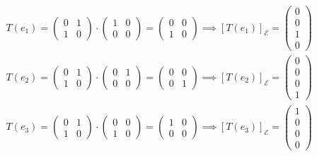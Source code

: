 \documentclass[12pt, titlepage]{article}
\begin{document}
\begin{gather*}
    T\left(e_1\right) = \begin{pmatrix}
        0 &1 \\ 1 & 0
    \end{pmatrix} \cdot \begin{pmatrix}
        1 & 0 \\ 0 & 0 
    \end{pmatrix} = \begin{pmatrix}
        0 & 0 \\ 1 & 0
    \end{pmatrix} \implies \left[T\left(e_1\right)\right]_\mathcal{E} = \begin{pmatrix}
        0\\0\\1\\0  \end{pmatrix} \\
     T\left(
e_2\right)  = \begin{pmatrix}0&1\\1&0\end{pmatrix}             \cdot \begin{pmatrix}
                0 & 1 \\ 0 & 0 
            \end{pmatrix}
 =\begin{pmatrix}
     0 & 0 \\ 0 & 1
 \end{pmatrix} \implies \left[T\left(e_2\right)\right]_\mathcal{E} = \begin{pmatrix}
        0\\0\\0\\1
    \end{pmatrix} \\ 
 T\left(e_3\right) =\begin{pmatrix}
     0 & 1 \\ 1 & 0
 \end{pmatrix}   \cdot \begin{pmatrix}
     0 & 0 \\ 1 & 0
 \end{pmatrix} = \begin{pmatrix}
     1 & 0 \\ 0 & 0 
 \end{pmatrix}  \implies \left[T\left(e_3\right)\right]_\mathcal{E} = \begin{pmatrix}
        1\\0\\0\\0

\end{pmatrix}
\end{gather*}
\end{document}
